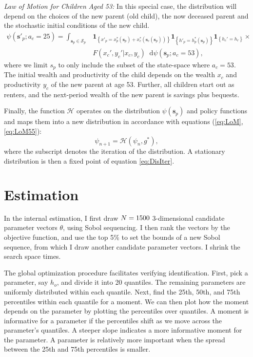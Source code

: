 \documentclass[12pt]{article}
\newcommand*\diff{\mathop{}\!\mathrm{d}}
\begin{document}
\textit{Law of Motion for Children Aged 53:} In this special case, the distribution will depend on the choices of the new parent (old child), the now deceased parent and the stochastic initial conditions of the new child. 
\begin{equation}\label{eq:LoM55}
\begin{split}
\psi(\mathbf{s}'_p;a_c=25) = \int_{\mathbf{s}_p\in \mathcal{S}_p} & 
\mathbf{1}_{\left\{ x'_p = x^*_p(\mathbf s_p) + x^*_c(\mathbf s_c(\mathbf s_p)) \right\} }
\mathbf{1}_{\left\{ h'_p = h^*_p(\mathbf s_p) \right\} } 
\mathbf{1}_{\left\{ h_c' = h_r\right\}} \times \\
&F(x_c',y_c'|x_c,y_c) \diff \psi(\mathbf s_p;a_c=53),
\end{split}
\end{equation}
where we limit $s_p$ to only include the subset of the state-space where $a_c=53$. The initial wealth and productivity of the child depends on the wealth $x_c$ and productivity $y_c$ of the new parent at age 53. Further, all children start out as renters, and the next-period wealth of the new parent is savings plus bequests.

Finally, the function $\mathcal{H}$ operates on the distribution $\psi(\mathbf{s}_p)$ and policy functions %
and maps them into a new distribution in accordance with equations (\ref{eq:LoM}, \ref{eq:LoM55}):
\begin{equation}\label{eq:DisIter}
\psi_{n+1} = \mathcal{H}(\psi_n,g^*),
\end{equation}
where the subscript denotes the iteration of the distribution. A stationary distribution is then a fixed point of equation \ref{eq:DisIter}.


\section{Estimation}\label{app:SMM}
In the internal estimation, I first draw $N=1500$ 3-dimensional candidate parameter vectors $\theta$, using Sobol sequencing. I then rank the vectors by the objective function, and use the top 5\% to set the bounds of a new Sobol sequence, from which I draw another {\parNest} candidate parameter vectors. I shrink the search space {\parNshrinks} times. 

The global optimization procedure facilitates verifying identification. First, pick a parameter, say $h_o$, and divide it into 20 quantiles. The remaining parameters are uniformly distributed within each quantile. Next, find the 25th, 50th, and 75th percentiles within each quantile for a moment. We can then plot how the moment depends on the parameter by plotting the percentiles over quantiles. A moment is informative for a parameter if the percentiles shift as we move across the parameter's quantiles. A steeper slope indicates a more informative moment for the parameter. A parameter is relatively more important when the spread between the 25th and 75th percentiles is smaller. 
\end{document}
